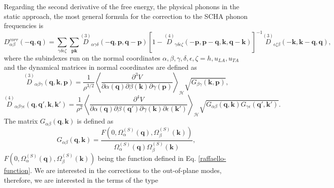 Regarding the second derivative of the free energy, the physical phonons in the static approach, the most general
formula for the correction to the SCHA phonon frequencies is
\begin{equation}
 \label{correction}
 D_{\alpha\beta}^{corr}(-\boldsymbol{q},\boldsymbol{q})=\sum_{\gamma\delta\epsilon\zeta}\sum_{\boldsymbol{p}\boldsymbol{k}}\overset{(3)}{D}{}_{\alpha\gamma\delta}(-\boldsymbol{q},\boldsymbol{p},
 \boldsymbol{q}-\boldsymbol{p})[1-\overset{(4)}{D}{}_{\gamma\delta\epsilon\zeta}(-\boldsymbol{p},\boldsymbol{p}-\boldsymbol{q},\boldsymbol{k},\boldsymbol{q}-\boldsymbol{k})]^{-1}\overset{(3)}{D}{}_{
 \epsilon\zeta\beta}(-\boldsymbol{k},\boldsymbol{k}-\boldsymbol{q},\boldsymbol{q}),
\end{equation}
where the subindexes run on the normal coordinates $\alpha,\beta,\gamma,\delta,\epsilon,\zeta=h,u_{LA},u_{TA}$ and 
the dynamical matrices in normal coordinates are defined as
\begin{equation}
 \label{third-order}
 \overset{(3)}{D}{}_{\alpha\beta\gamma}(\boldsymbol{q},\boldsymbol{k},\boldsymbol{p})=\frac{1}{\rho^{3/2}}\left\langle\frac{\partial^{3}V}{\partial\alpha(\boldsymbol{q})\partial\beta(\boldsymbol{k})\partial\gamma(\boldsymbol{
 p})}\right\rangle_{\mathcal{H}}\sqrt{G_{\beta\gamma}(\boldsymbol{k},\boldsymbol{p})},
\end{equation}
\begin{equation}
 \label{fourth-order}
 \overset{(4)}{D}{}_{\alpha\beta\gamma\epsilon}(\boldsymbol{q},\boldsymbol{q}',\boldsymbol{k},\boldsymbol{k}')=\frac{1}{\rho^{2}}\left\langle\frac{\partial^{4}V}{\partial\alpha(\boldsymbol{q})\partial\beta(\boldsymbol{
 q}')\partial\gamma(\boldsymbol{k})\partial\epsilon(\boldsymbol{k}')}\right\rangle_{\mathcal{H}}\sqrt{G_{\alpha\beta}(\boldsymbol{q},\boldsymbol{k})G_{\gamma\epsilon}(\boldsymbol{q}',\boldsymbol{k}')}.
\end{equation}
The matrix $G_{\alpha\beta}(\boldsymbol{q},\boldsymbol{k})$ is defined as
\begin{equation}
	G_{\alpha\beta}(\boldsymbol{q},\boldsymbol{k})=\frac{F(0,\Omega_{\alpha}^{(S)}(\boldsymbol{q}),\Omega_{\beta}^{(S)}(\boldsymbol{k}))}{\Omega_{\alpha}^{(S)}(\boldsymbol{q})\Omega_{\beta}^{(S)}(\boldsymbol{k})},
\end{equation}
$F(0,\Omega_{\alpha}^{(S)}(\boldsymbol{q}),\Omega_{\beta}^{(S)}(\boldsymbol{k}))$ being the function defined in
Eq. \ref{raffaello-function}. We are interested in the corrections to the out-of-plane modes, therefore, we are
interested in the terms of the type
